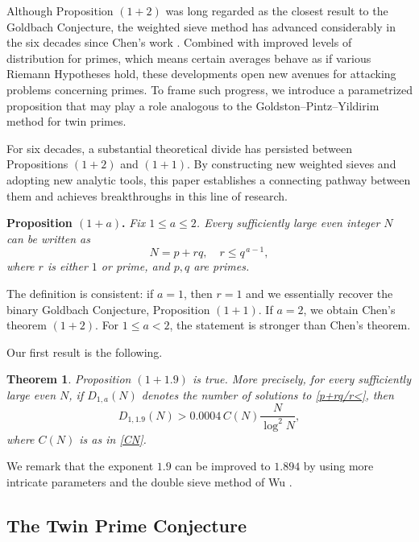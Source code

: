 \documentclass[12pt, a4paper]{amsart}
\def\le{\leqslant}
\theoremstyle{plain}
\newtheorem{theorem}{Theorem}[section]
\theoremstyle{remark}
\numberwithin{equation}{section}
\begin{document}
\medskip 

Although Proposition $(1+2)$ was long regarded as the closest result 
to the Goldbach Conjecture, the weighted sieve method has 
advanced considerably in the six decades since Chen’s work \cite{Chen66}. Combined with improved 
levels of distribution for primes, which means certain averages behave as if various Riemann Hypotheses 
hold, these developments open new avenues for attacking problems concerning primes.  
To frame such progress, we introduce a parametrized proposition that may play a role 
analogous to the Goldston--Pintz--Yildirim method for twin primes. 

For six decades, a substantial theoretical divide has persisted between Propositions $(1+2)$ and $(1+1)$. 
By constructing new weighted sieves and adopting new 
analytic tools, this paper establishes a connecting pathway between them and achieves 
breakthroughs in this line of research. 

\medskip
\noindent
{\bf Proposition $(1+a)$.}   
{\it Fix $1 \le a \le 2$. Every sufficiently large even integer $N$ can be written as
\begin{equation}\label{p+rq/r<}
N = p + r q, \quad r \le q^{\,a-1},
\end{equation}
where $r$ is either $1$ or prime, and $p, q$ are primes.} 
\medskip

The definition is consistent: if $a = 1$, then $r = 1$ and we essentially recover the binary Goldbach Conjecture,  
Proposition $(1+1)$. If $a = 2$, we obtain Chen’s theorem $(1+2)$. For $1 \le a < 2$, the statement is stronger than Chen’s theorem.

Our first result is the following.

\begin{theorem}\label{Goldbach1}
Proposition $(1+1.9)$ is true.  
More precisely, for every sufficiently large even $N$, if $D_{1,a}(N)$ denotes the number of solutions to \eqref{p+rq/r<}, then
\[
D_{1,1.9}(N) > 0.0004 \, C(N) \frac{N}{\log^2 N},
\]
where $C(N)$ is as in \eqref{CN}.
\end{theorem}
We remark that the exponent $1.9$ can be improved to $1.894$ by using more intricate parameters and the double sieve method of Wu \cite{Wu08}.

\subsection{The Twin Prime Conjecture}
\end{document}
